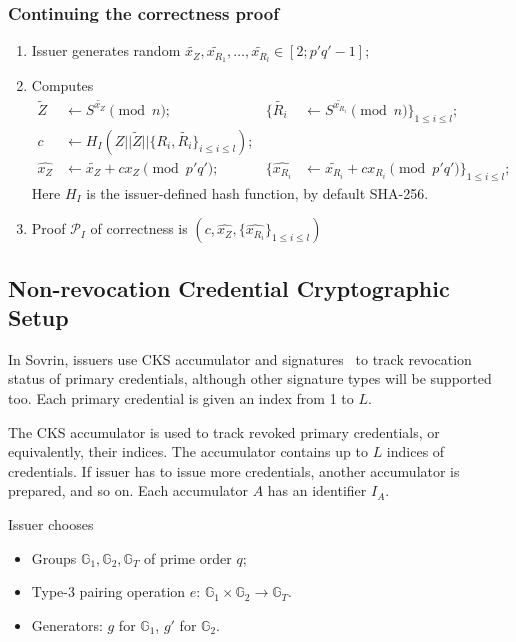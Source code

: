 \subsubsection{Continuing the correctness proof}
\begin{enumerate}
\item Issuer generates random $\widetilde{x_Z}, \widetilde{x_{R_1}},\ldots,\widetilde{x_{R_l}}\in [2; p'q'-1]$;
\item Computes 
\begin{align}
\widetilde{Z}& \leftarrow S^{\widetilde{x_Z}}\pmod{n};& \{\widetilde{R_i} &
\leftarrow S^{\widetilde{x_{R_i}}}\pmod{n}\}_{1\leq i \leq l};\\
c &\leftarrow H_I(Z||\widetilde{Z}||\{R_i,\widetilde{R_i}\}_{i\leq i \leq l});\\
\widehat{x_Z}& \leftarrow \widetilde{x_Z}+c x_Z \pmod{p'q'};&
\{\widehat{x_{R_i}}&\leftarrow \widetilde{x_{R_i}}+c x_{R_i}\pmod{p'q'}\}_{1\leq i \leq l};
\end{align}
Here $H_I$ is the issuer-defined hash function, by default SHA-256.

\item Proof $\mathcal{P}_I$ of correctness is $(c,\widehat{x_Z},\{\widehat{x_{R_i}}\}_{1 \leq i \leq l})$
\end{enumerate}
\subsection{Non-revocation Credential Cryptographic Setup}
In Sovrin, issuers use CKS accumulator and signatures~\cite{CamenischKS09} to track revocation status of primary credentials, although other signature types will be supported too. Each primary credential is given an index from 1 to $L$.

The CKS  accumulator is used to track revoked primary credentials, or equivalently, their indices. The accumulator contains up to $L$ indices of credentials. If issuer has to issue more credentials, another accumulator is prepared, and so on. Each accumulator $A$ has an identifier $I_A$.

Issuer chooses
\begin{itemize}
    \item Groups $\mathbb{G}_1,\mathbb{G}_2,\mathbb{G}_T$ of
    prime order $q$;
    \item Type-3 pairing operation $e:\, \mathbb{G}_1\times\mathbb{G}_2\rightarrow\mathbb{G}_T$.
    \item Generators: $g$ for $\mathbb{G}_1$, $g'$ for
    $\mathbb{G}_2$.
\end{itemize}

